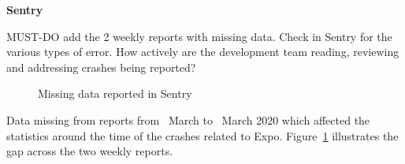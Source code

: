\textbf{Sentry}

MUST-DO add the 2 weekly reports with missing data. Check in Sentry for the various types of error. How actively are the development team reading, reviewing and addressing crashes being reported? 

\begin{figure}
    \centering
    \caption{Missing data reported in Sentry}
    \label{fig:sentry-missing-data-march-2020}
\end{figure}

Data missing from reports from~ March to~ March 2020 which affected the statistics around the time of the crashes related to Expo. Figure~\ref{fig:sentry-missing-data-march-2020} illustrates the gap across the two weekly reports. 

